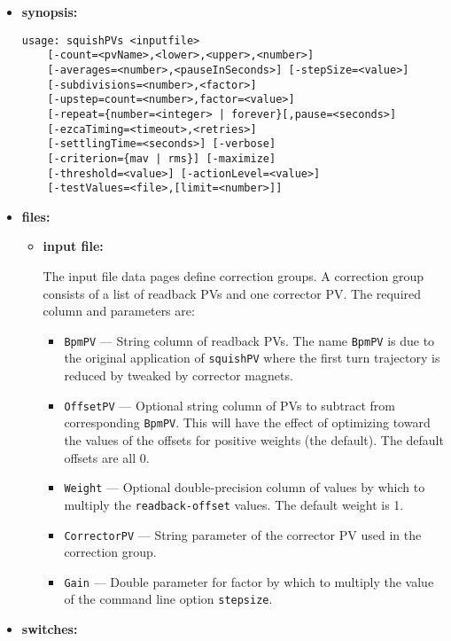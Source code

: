 \begin{itemize}
\item {\bf synopsis:} 
%
%
\begin{verbatim}
usage: squishPVs <inputfile> 
    [-count=<pvName>,<lower>,<upper>,<number>] 
    [-averages=<number>,<pauseInSeconds>] [-stepSize=<value>] 
    [-subdivisions=<number>,<factor>]
    [-upstep=count=<number>,factor=<value>]
    [-repeat={number=<integer> | forever}[,pause=<seconds>]
    [-ezcaTiming=<timeout>,<retries>]
    [-settlingTime=<seconds>] [-verbose]
    [-criterion={mav | rms}] [-maximize]
    [-threshold=<value>] [-actionLevel=<value>]
    [-testValues=<file>,[limit=<number>]]
\end{verbatim}

\item {\bf files:}
\begin{itemize}
\item {\bf input file:}\par
The input file data pages define correction groups. A correction group
consists of a list of readback PVs and one corrector PV. The required column and parameters are:
\begin{itemize}
        \item {\tt BpmPV} --- String column of readback PVs. The name \verb+BpmPV+ is due
                to the original application of \verb+squishPV+ where the first turn
                trajectory is reduced by tweaked by corrector magnets.
        \item {\tt OffsetPV} --- Optional string column of PVs to subtract from corresponding \verb+BpmPV+.
                This will have the effect of optimizing toward the values of the offsets for
                positive weights (the default).  The default offsets are all 0.
        \item {\tt Weight} --- Optional double-precision column of values by which to multiply the
                \verb+readback-offset+ values.  The default weight is 1.
        \item {\tt CorrectorPV} --- String parameter of the corrector PV used in the correction group.
        \item {\tt Gain} --- Double parameter for factor by which to multiply the 
                value of the command line option \verb+stepsize+. 
\end{itemize}
\end{itemize}
%
\item {\bf switches:}
%

\end{itemize}
